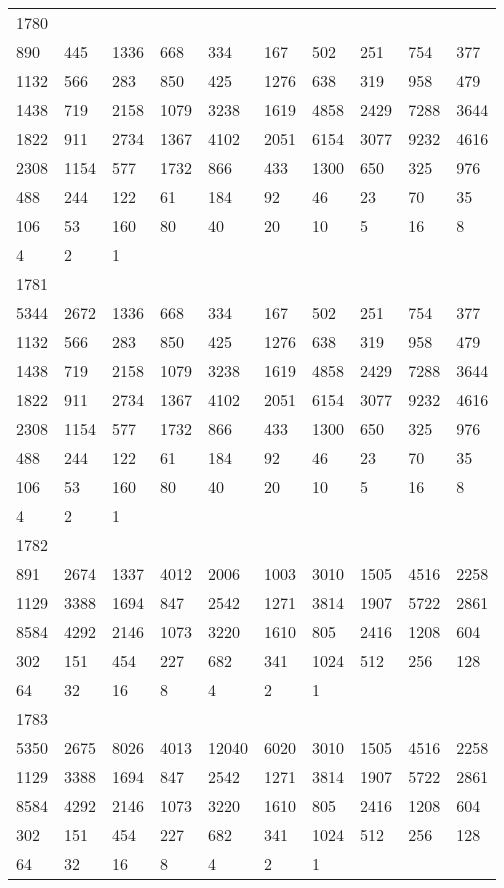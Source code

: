 \begin{longtable}{*{10}{l}}
1780&&&&&&&&&\\
890& 445& 1336& 668& 334& 167& 502& 251& 754& 377\\
1132& 566& 283& 850& 425& 1276& 638& 319& 958& 479\\
1438& 719& 2158& 1079& 3238& 1619& 4858& 2429& 7288& 3644\\
1822& 911& 2734& 1367& 4102& 2051& 6154& 3077& 9232& 4616\\
2308& 1154& 577& 1732& 866& 433& 1300& 650& 325& 976\\
488& 244& 122& 61& 184& 92& 46& 23& 70& 35\\
106& 53& 160& 80& 40& 20& 10& 5& 16& 8\\
4& 2& 1& \\

1781&&&&&&&&&\\
5344& 2672& 1336& 668& 334& 167& 502& 251& 754& 377\\
1132& 566& 283& 850& 425& 1276& 638& 319& 958& 479\\
1438& 719& 2158& 1079& 3238& 1619& 4858& 2429& 7288& 3644\\
1822& 911& 2734& 1367& 4102& 2051& 6154& 3077& 9232& 4616\\
2308& 1154& 577& 1732& 866& 433& 1300& 650& 325& 976\\
488& 244& 122& 61& 184& 92& 46& 23& 70& 35\\
106& 53& 160& 80& 40& 20& 10& 5& 16& 8\\
4& 2& 1& \\

1782&&&&&&&&&\\
891& 2674& 1337& 4012& 2006& 1003& 3010& 1505& 4516& 2258\\
1129& 3388& 1694& 847& 2542& 1271& 3814& 1907& 5722& 2861\\
8584& 4292& 2146& 1073& 3220& 1610& 805& 2416& 1208& 604\\
302& 151& 454& 227& 682& 341& 1024& 512& 256& 128\\
64& 32& 16& 8& 4& 2& 1& \\

1783&&&&&&&&&\\
5350& 2675& 8026& 4013& 12040& 6020& 3010& 1505& 4516& 2258\\
1129& 3388& 1694& 847& 2542& 1271& 3814& 1907& 5722& 2861\\
8584& 4292& 2146& 1073& 3220& 1610& 805& 2416& 1208& 604\\
302& 151& 454& 227& 682& 341& 1024& 512& 256& 128\\
64& 32& 16& 8& 4& 2& 1& \\


\end{longtable}
